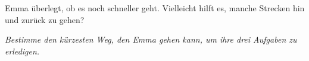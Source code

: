 {{\centering%
\par}

Emma überlegt, ob es noch schneller geht.
Vielleicht hilft es, manche Strecken hin und zurück zu gehen?



{\em
Bestimme den kürzesten Weg, den Emma gehen kann, um ihre drei Aufgaben zu erledigen.

{\centering%
\par}


}



}
